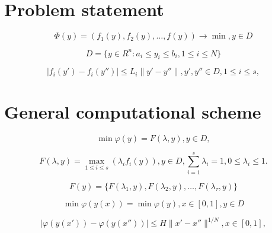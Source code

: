 \documentclass[runningheads]{llncs}
\begin{document}
\cite{Miettinen1999,Ehrgott2005,Pardalos2017,ML_MCO_2023,Evtushenko2014,Deb2002,Durillo2010,Mostaghim2007,NDG09,RC05,ZLT01,Gergel2019_2,Gergel2018,GergelKozinov2020,Marler2004,Strongin2000,Sergeyev2013,SVM_2000,PROB_2004,iOpt_url,Grishagin2015_2}

\section{Problem statement}
\label{sec:2}

\begin{equation}
\label{eq:01}
  \Phi(y) = (f_1 (y),f_2 (y), \dots, f(y)) \to \min, y \in D
\end{equation}

\begin{equation}
\label{eq:02}
    D=\{y \in R^n : a_i \leq y_i \leq b_i, 1 \leq i \leq N\}
\end{equation}


\begin{equation}
\label{eq:03}
|f_i (y') - f_i (y'')| \leq L_i \|y' - y''\| ,y',y'' \in D, 1 \leq i \leq s,
\end{equation}

\section{General computational scheme}
\label{sec:3}

\begin{equation}
\label{eq:04}
\min \varphi(y) = F( \lambda, y ), y \in D,
\end{equation}


\begin{equation}
\label{eq:05}
F(\lambda, y) = \max_{1 \leq i \leq s} {(\lambda_i f_i (y))}, y \in D, \sum_{i=1}^s {\lambda_i} = 1, 0 \leq \lambda_i \leq 1.
\end{equation}


\begin{equation}
\label{eq:06}
F(y) = \{ F(\lambda_1,y),F(\lambda_2,y), \dots ,F(\lambda_\tau,y)\}
\end{equation}


\begin{equation}
\label{eq:07}
\min{\varphi(y(x))} = \min {\varphi(y)}, x \in [0,1], y \in D
\end{equation}


\begin{equation}
\label{eq:08}
|\varphi(y(x')) - \varphi(y(x''))| \leq H \|x' - x''\|^{1/N} , x \in [0,1],
\end{equation}
\end{document}
